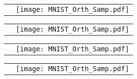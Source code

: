\documentclass[acmtog, nonacm]{acmart}
\begin{document}
\begin{figure}
\raggedright

\begin{subfigure}[b]{0.75\linewidth}
\begin{tabular}
      {ll}
      \begin{turn}{90}
      \makebox[1.5cm]{
      \begin{turn}{-90}
      (a) 
      \end{turn}}\end{turn}
      &
      \texttt{[image: MNIST\_Orth\_Samp.pdf]}
 \end{tabular}
  \label{fig:mnist1} 
\end{subfigure}

\begin{subfigure}[b]{0.75\linewidth}
\begin{tabular}
      {ll}
      \begin{turn}{90}
      \makebox[1.5cm]{
      \begin{turn}{-90}
      (b) 
      \end{turn}}\end{turn}
      &
   \texttt{[image: MNIST\_Orth\_Samp.pdf]}
      \\
 \end{tabular}
  \label{fig:mnist2} 
\end{subfigure}

\begin{subfigure}[b]{0.75\linewidth}
\begin{tabular}
      {ll}
      \begin{turn}{90}
      \makebox[1.5cm]{
      \begin{turn}{-90}
      (c) 
      \end{turn}}\end{turn}
      &
   \texttt{[image: MNIST\_Orth\_Samp.pdf]}
      \\
 \end{tabular}
  \label{fig:mnist3} 
\end{subfigure}


\begin{subfigure}[b]{0.75\linewidth}
\begin{tabular}
      {ll}
      \begin{turn}{90}
      \makebox[1.5cm]{
      \begin{turn}{-90}
      (d) 
      \end{turn}}\end{turn}
      &
   \texttt{[image: MNIST\_Orth\_Samp.pdf]}
      \\
 \end{tabular}
  \label{fig:mnist4} 
\end{subfigure}



\end{figure}
\end{document}
